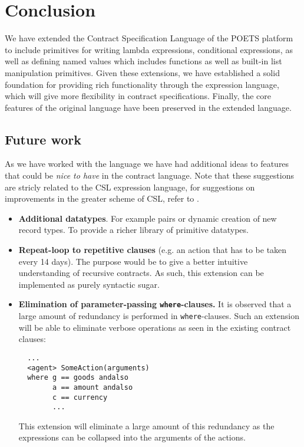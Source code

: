 \documentclass[10pt,a4paper,final,oneside,openany,article]{memoir}
\begin{document}
\chapter{Conclusion}
We have extended the Contract Specification Language of the POETS
platform to include primitives for writing lambda expressions,
conditional expressions, as well as defining named values which includes
functions as well as built-in list manipulation primitives. Given these
extensions, we have established a solid foundation for providing rich
functionality through the expression language, which will give more
flexibility in contract specifications.
Finally, the core features of the original language \cite[page
4]{hvitved10} have been preserved in the extended language.


\section{Future work}
As we have worked with the language we have had additional ideas to
features that could be \textit{nice to have} in the contract language.
Note that these suggestions are stricly related to the CSL expression
language, for suggestions on improvements in the greater scheme of CSL,
refer to \cite{hvitved10}.
\begin{itemize}
\item \textbf{Additional datatypes}. For example pairs or dynamic
  creation of new record types. To provide a richer library of primitive
  datatypes.
\item \textbf{Repeat-loop to repetitive clauses} (e.g. an action that
  has to be taken every 14 days). The purpose would be to give a better
  intuitive understanding of recursive contracts. As such, this
  extension can be implemented as purely syntactic sugar.
\item \textbf{Elimination of parameter-passing \lstinline{where}-clauses.} It is
  observed that a large amount of redundancy is performed in
  \lstinline{where}-clauses. Such an extension will be able to eliminate
  verbose operations as seen in the existing contract clauses:
  \begin{lstlisting}
  ...
  <agent> SomeAction(arguments)
  where g == goods andalso
        a == amount andalso
        c == currency
        ...
  \end{lstlisting}
  This extension will eliminate a large amount of this redundancy as
  the expressions can be collapsed into the arguments of the actions.
\end{itemize}
\end{document}
